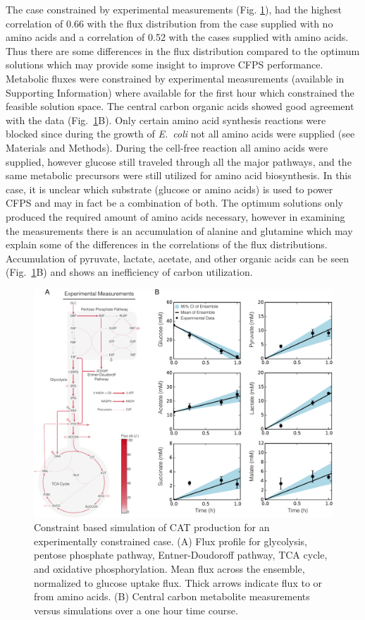 \documentclass[journal=asbcd6,manuscript=article]{achemso}
\begin{document}
The case constrained by experimental measurements (Fig. \ref{fig:flux_exp}), had the highest correlation of 0.66 with the flux distribution from the case supplied with no amino acids and a correlation of 0.52 with the cases supplied with amino acids.
Thus there are some differences in the flux distribution compared to the optimum solutions which may provide some insight to improve CFPS performance.
Metabolic fluxes were constrained by experimental measurements (available in Supporting Information) where available for the first hour
which constrained the feasible solution space.
The central carbon organic acids showed good agreement with the data (Fig.~\ref{fig:flux_exp}B).
Only certain amino acid synthesis reactions were blocked since during the growth of \emph{E.~coli} not all amino acids were supplied (see Materials and Methods).
During the cell-free reaction all amino acids were supplied, however glucose still traveled through all the major pathways, and the same metabolic precursors were still utilized for amino acid biosynthesis.
In this case, it is unclear which substrate (glucose or amino acids) is used to power CFPS and may in fact be a combination of both.
The optimum solutions only produced the required amount of amino acids necessary, however in examining the measurements there is an accumulation of alanine and glutamine which may explain some of the differences in the correlations of the flux distributions.
Accumulation of pyruvate, lactate, acetate, and other organic acids can be seen (Fig.~\ref{fig:flux_exp}B) and shows an inefficiency of carbon utilization.
\begin{figure}[t!]
\includegraphics[width=1.00\textwidth]{./figs/Fig-6-FluxDistribition-Experimental.pdf}
\caption{Constraint based simulation of CAT production for an experimentally constrained case. (A) Flux profile for glycolysis, pentose phosphate pathway, Entner-Doudoroff pathway, TCA cycle, and oxidative phosphorylation.  Mean flux across the ensemble, normalized to glucose uptake flux. Thick arrows indicate flux to or from amino acids. (B) Central carbon metabolite measurements versus simulations over a one hour time course.}
\label{fig:flux_exp}
\end{figure}
\end{document}
